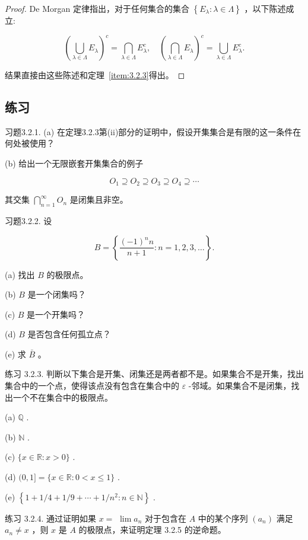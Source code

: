 \begin{proof}
  De Morgan 定律指出，对于任何集合的集合 \(\left\{  {{E}_{\lambda } : \lambda  \in  \Lambda }\right\}\) ，以下陈述成立:

\[
{\left( \mathop{\bigcup }\limits_{{\lambda  \in  \Lambda }}{E}_{\lambda }\right) }^{c} = \mathop{\bigcap }\limits_{{\lambda  \in  \Lambda }}{E}_{\lambda }^{c},\quad {\left( \mathop{\bigcap }\limits_{{\lambda  \in  \Lambda }}{E}_{\lambda }\right) }^{c} = \mathop{\bigcup }\limits_{{\lambda  \in  \Lambda }}{E}_{\lambda }^{c}.
\]

结果直接由这些陈述和定理~\ref{item:3.2.3}得出。
\end{proof}


\subsection{练习}

习题3.2.1. (a) 在定理3.2.3第(ii)部分的证明中，假设开集集合是有限的这一条件在何处被使用？

(b) 给出一个无限嵌套开集集合的例子

\[
{O}_{1} \supseteq  {O}_{2} \supseteq  {O}_{3} \supseteq  {O}_{4} \supseteq  \cdots
\]

其交集 \(\mathop{\bigcap }\limits_{{n = 1}}^{\infty }{O}_{n}\) 是闭集且非空。

习题3.2.2. 设

\[
B = \left\{  {\frac{{\left( -1\right) }^{n}n}{n + 1} : n = 1,2,3,\ldots }\right\}  .
\]

(a) 找出 \(B\) 的极限点。

(b) \(B\) 是一个闭集吗？

(c) \(B\) 是一个开集吗？

(d) \(B\) 是否包含任何孤立点？

(e) 求 \(\bar{B}\) 。

练习 3.2.3. 判断以下集合是开集、闭集还是两者都不是。如果集合不是开集，找出集合中的一个点，使得该点没有包含在集合中的 \(\varepsilon\) -邻域。如果集合不是闭集，找出一个不在集合中的极限点。

(a) \(\mathbb{Q}\) .

(b) \(\mathbb{N}\) .

(c) \(\{ x \in  \mathbb{R} : x > 0\}\) .

(d) \((0,1\rbrack  = \{ x \in  \mathbb{R} : 0 < x \leq  1\}\) .

(e) \(\left\{  {1 + 1/4 + 1/9 + \cdots  + 1/{n}^{2} : n \in  \mathbb{N}}\right\}\) .

练习 3.2.4. 通过证明如果 \(x =\)  \(\lim {a}_{n}\) 对于包含在 \(A\) 中的某个序列 \(\left( {a}_{n}\right)\) 满足 \({a}_{n} \neq  x\) ，则 \(x\) 是 \(A\) 的极限点，来证明定理 3.2.5 的逆命题。

